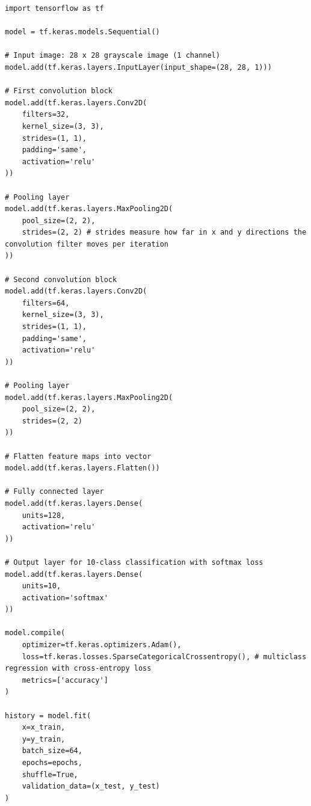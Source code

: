 \documentclass{article}
\begin{document}
\begin{verbatim}
import tensorflow as tf

model = tf.keras.models.Sequential()

# Input image: 28 x 28 grayscale image (1 channel)
model.add(tf.keras.layers.InputLayer(input_shape=(28, 28, 1)))

# First convolution block
model.add(tf.keras.layers.Conv2D(
    filters=32,
    kernel_size=(3, 3),
    strides=(1, 1),
    padding='same',
    activation='relu'
))

# Pooling layer
model.add(tf.keras.layers.MaxPooling2D(
    pool_size=(2, 2),
    strides=(2, 2) # strides measure how far in x and y directions the convolution filter moves per iteration
))

# Second convolution block
model.add(tf.keras.layers.Conv2D(
    filters=64,
    kernel_size=(3, 3),
    strides=(1, 1),
    padding='same',
    activation='relu'
))

# Pooling layer
model.add(tf.keras.layers.MaxPooling2D(
    pool_size=(2, 2),
    strides=(2, 2)
))

# Flatten feature maps into vector
model.add(tf.keras.layers.Flatten())

# Fully connected layer
model.add(tf.keras.layers.Dense(
    units=128,
    activation='relu'
))

# Output layer for 10-class classification with softmax loss
model.add(tf.keras.layers.Dense(
    units=10,
    activation='softmax'
))

model.compile(
    optimizer=tf.keras.optimizers.Adam(),
    loss=tf.keras.losses.SparseCategoricalCrossentropy(), # multiclass regression with cross-entropy loss
    metrics=['accuracy']
)

history = model.fit(
    x=x_train,
    y=y_train,
    batch_size=64,
    epochs=epochs,
    shuffle=True,
    validation_data=(x_test, y_test)
)
\end{verbatim}
\end{document}
